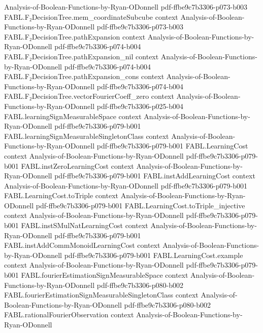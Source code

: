 \begin{theorem}
  {Analysis-of-Boolean-Functions-by-Ryan-ODonnell}
  {pdf-ffbe9c7b3306-p073-b003}
\proofstep
  {FABL.F₂DecisionTree.mem_coordinateSubcube}
  {context}
  {Analysis-of-Boolean-Functions-by-Ryan-ODonnell}
  {pdf-ffbe9c7b3306-p073-b003}
\proofstep
  {FABL.F₂DecisionTree.pathExpansion}
  {context}
  {Analysis-of-Boolean-Functions-by-Ryan-ODonnell}
  {pdf-ffbe9c7b3306-p074-b004}
\proofstep
  {FABL.F₂DecisionTree.pathExpansion_nil}
  {context}
  {Analysis-of-Boolean-Functions-by-Ryan-ODonnell}
  {pdf-ffbe9c7b3306-p074-b004}
\proofstep
  {FABL.F₂DecisionTree.pathExpansion_cons}
  {context}
  {Analysis-of-Boolean-Functions-by-Ryan-ODonnell}
  {pdf-ffbe9c7b3306-p074-b004}
\proofstep
  {FABL.F₂DecisionTree.vectorFourierCoeff_zero}
  {context}
  {Analysis-of-Boolean-Functions-by-Ryan-ODonnell}
  {pdf-ffbe9c7b3306-p025-b004}
\proofstep
  {FABL.learningSignMeasurableSpace}
  {context}
  {Analysis-of-Boolean-Functions-by-Ryan-ODonnell}
  {pdf-ffbe9c7b3306-p079-b001}
\proofstep
  {FABL.learningSignMeasurableSingletonClass}
  {context}
  {Analysis-of-Boolean-Functions-by-Ryan-ODonnell}
  {pdf-ffbe9c7b3306-p079-b001}
\proofstep
  {FABL.LearningCost}
  {context}
  {Analysis-of-Boolean-Functions-by-Ryan-ODonnell}
  {pdf-ffbe9c7b3306-p079-b001}
\proofstep
  {FABL.instZeroLearningCost}
  {context}
  {Analysis-of-Boolean-Functions-by-Ryan-ODonnell}
  {pdf-ffbe9c7b3306-p079-b001}
\proofstep
  {FABL.instAddLearningCost}
  {context}
  {Analysis-of-Boolean-Functions-by-Ryan-ODonnell}
  {pdf-ffbe9c7b3306-p079-b001}
\proofstep
  {FABL.LearningCost.toTriple}
  {context}
  {Analysis-of-Boolean-Functions-by-Ryan-ODonnell}
  {pdf-ffbe9c7b3306-p079-b001}
\proofstep
  {FABL.LearningCost.toTriple_injective}
  {context}
  {Analysis-of-Boolean-Functions-by-Ryan-ODonnell}
  {pdf-ffbe9c7b3306-p079-b001}
\proofstep
  {FABL.instSMulNatLearningCost}
  {context}
  {Analysis-of-Boolean-Functions-by-Ryan-ODonnell}
  {pdf-ffbe9c7b3306-p079-b001}
\proofstep
  {FABL.instAddCommMonoidLearningCost}
  {context}
  {Analysis-of-Boolean-Functions-by-Ryan-ODonnell}
  {pdf-ffbe9c7b3306-p079-b001}
\proofstep
  {FABL.LearningCost.example}
  {context}
  {Analysis-of-Boolean-Functions-by-Ryan-ODonnell}
  {pdf-ffbe9c7b3306-p079-b001}
\proofstep
  {FABL.fourierEstimationSignMeasurableSpace}
  {context}
  {Analysis-of-Boolean-Functions-by-Ryan-ODonnell}
  {pdf-ffbe9c7b3306-p080-b002}
\proofstep
  {FABL.fourierEstimationSignMeasurableSingletonClass}
  {context}
  {Analysis-of-Boolean-Functions-by-Ryan-ODonnell}
  {pdf-ffbe9c7b3306-p080-b002}
\proofstep
  {FABL.rationalFourierObservation}
  {context}
  {Analysis-of-Boolean-Functions-by-Ryan-ODonnell}

\end{theorem}
